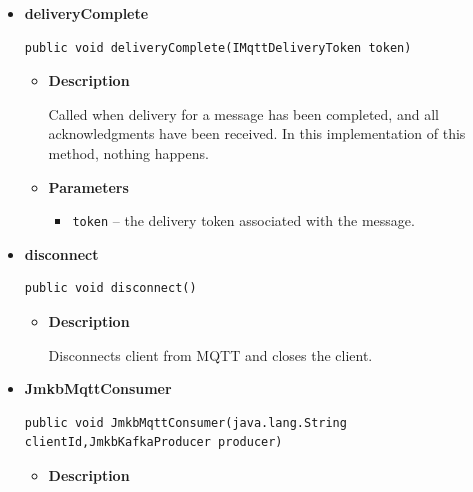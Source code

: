 {{{{{\begin{itemize}
{\begin{itemize}
{This method is called when the connection to the server is lost.
}
\item{
{\bf  Parameters}
  \begin{itemize}
   \item{
\texttt{cause} -- the reason behind the loss of connection.}
  \end{itemize}
}%
\end{itemize}
}%
\item{ 
\hypertarget{Bridge.JmkbMqttConsumer.deliveryComplete(IMqttDeliveryToken)}{{\bf  deliveryComplete}\\}
\begin{lstlisting}[frame=none]
public void deliveryComplete(IMqttDeliveryToken token)\end{lstlisting} %
\begin{itemize}
\item{
{\bf  Description}

Called when delivery for a message has been completed, and all acknowledgments have been received. In this implementation of this method, nothing happens.
}
\item{
{\bf  Parameters}
  \begin{itemize}
   \item{
\texttt{token} -- the delivery token associated with the message.}
  \end{itemize}
}%
\end{itemize}
}%
\item{ 
\hypertarget{Bridge.JmkbMqttConsumer.disconnect()}{{\bf  disconnect}\\}
\begin{lstlisting}[frame=none]
public void disconnect()\end{lstlisting} %
\begin{itemize}
\item{
{\bf  Description}

Disconnects client from MQTT and closes the client.
}
\end{itemize}
}%
\item{ 
\hypertarget{Bridge.JmkbMqttConsumer.JmkbMqttConsumer(java.lang.String, Bridge.JmkbKafkaProducer)}{{\bf  JmkbMqttConsumer}\\}
\begin{lstlisting}[frame=none]
public void JmkbMqttConsumer(java.lang.String clientId,JmkbKafkaProducer producer)\end{lstlisting} %
\begin{itemize}
\item{
{\bf  Description}

}
\end{itemize}}
\end{itemize}}}}}}
